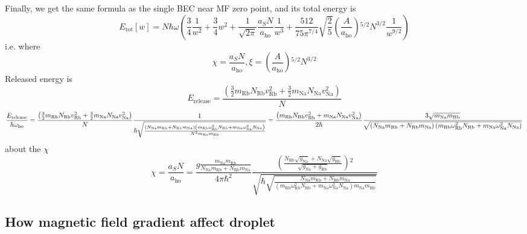 Finally, we get the same formula as the single BEC near MF zero point, and its total energy is
\begin{equation}
E_{\text{tot}}[w]=N \hbar  \omega  \left(\frac{3}{4}\frac{1}{w^2}+\frac{3}{4}w^2+\frac{1}{\sqrt{2\pi }}\frac{a_SN}{a_{\text{ho}}}\frac{1}{w^3}+\frac{512}{75 \pi^{7/4}}\sqrt{\frac{2}{5}}\left(\frac{A}{a_{\text{ho}}}\right){}^{5/2}N^{3/2}\frac{1}{ w^{9/2}}\right)
\end{equation}
i.e. where
\begin{equation}
\chi =\frac{a_SN}{a_{\text{ho}}}, \xi =\left(\frac{A}{a_{\text{ho}}}\right){}^{5/2}N^{3/2}
\end{equation}
Released energy is
\begin{equation}
E_{\text{release}}=\frac{\left(\frac{3}{2}m_{\text{Rb}}N_{\text{Rb}}v_{\text{Rb}}^2+\frac{3}{2}m_{\text{Na}}N_{\text{Na}}v_{\text{Na}}^2\right)}{N}
\end{equation}
\begin{equation}
\frac{E_{\text{release}}}{\hbar  \omega _{\text{ho}}}=\\
\frac{\left(\frac{3}{2}m_{\text{Rb}}N_{\text{Rb}}v_{\text{Rb}}^2+\frac{3}{2}m_{\text{Na}}N_{\text{Na}}v_{\text{Na}}^2\right)}{N}\frac{1}{\hbar \sqrt{\frac{\left(N_{\text{Na}}m_{\text{Rb}}+N_{\text{Rb}}m_{\text{Na}}\right)\left(m_{\text{Rb}}
\omega _{\text{Rb}}^2N_{\text{Rb}}+m_{\text{Na}} \omega _{\text{Na}}^2N_{\text{Na}}\right)}{N^2m_{\text{Na}}m_{\text{Rb}}}}}=\frac{\left(m_{\text{Rb}}N_{\text{Rb}}v_{\text{Rb}}^2+m_{\text{Na}}N_{\text{Na}}v_{\text{Na}}^2\right)}{2\hbar
}\frac{3\sqrt{m_{\text{Na}}m_{\text{Rb}}}}{\sqrt{\left(N_{\text{Na}}m_{\text{Rb}}+N_{\text{Rb}}m_{\text{Na}}\right)\left(m_{\text{Rb}} \omega _{\text{Rb}}^2N_{\text{Rb}}+m_{\text{Na}}
\omega _{\text{Na}}^2N_{\text{Na}}\right)}}
\end{equation}
about the $\chi$
\begin{equation}\chi =\frac{a_SN}{a_{\text{ho}}}=\frac{g \frac{m_{\text{Na}}m_{\text{Rb}}}{N_{\text{Na}}m_{\text{Rb}}+N_{\text{Rb}}m_{\text{Na}}}}{4\pi  \hbar
^2}\frac{\left(\frac{N_{\text{Rb}}\sqrt{g_{\text{Na}}}+N_{\text{Na}}\sqrt{g_{\text{Rb}}}}{\sqrt{g_{\text{Na}}+g_{\text{Rb}}}}\right){}^2}{\sqrt{\hbar
\sqrt{\frac{N_{\text{Na}}m_{\text{Rb}}+N_{\text{Rb}}m_{\text{Na}}}{\left(m_{\text{Rb}} \omega _{\text{Rb}}^2N_{\text{Rb}}+m_{\text{Na}} \omega _{\text{Na}}^2N_{\text{Na}}\right)m_{\text{Na}}m_{\text{Rb}}}}}}
\end{equation}

\subsection{How magnetic field gradient affect droplet}


